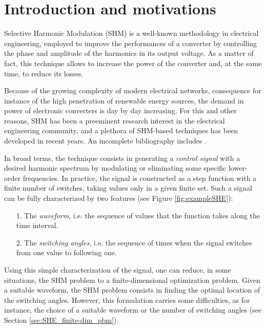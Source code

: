\documentclass[twocolumn]{autart}    %
\begin{document}
\begin{frontmatter}
\end{frontmatter}


\section{Introduction and motivations}\label{Section1}

Selective Harmonic Modulation (SHM) \cite{Rodriguez2002} is a well-known methodology in electrical engineering, employed to improve the performances of a converter by controlling the phase and amplitude of the harmonics in its output voltage. As a matter of fact, this technique allows to increase the power of the converter and, at the same time, to reduce its losses. 

Because of the growing complexity of modern electrical networks, consequence for instance of the high penetration of renewable energy sources, the demand in power of electronic converters is day by day increasing. For this and other reasons, SHM has been a preeminent research interest in the electrical engineering community, and a plethora of SHM-based techniques has been developed in recent years. An incomplete bibliography includes \cite{duranay2017selective,Janabi2020,Yang2017}.

In broad terms, the technique consists in generating a \textit{control signal} with a desired harmonic spectrum by modulating or eliminating some specific lower-order frequencies. In practice, the signal is constructed as a step function with a finite number of switches, taking values only in a given finite set. Such a signal can be fully characterized by two features (see Figure \ref{fig:exampleSHE}): 
\begin{itemize}
	\item[1.] The \textit{waveform}, i.e. the sequence of values that the function takes along the time interval.
	\item[2.] The \textit{switching angles}, i.e. the sequence of times when the signal switches from one value to following one. 
\end{itemize}
Using this simple characterization of the signal, one can reduce, in some situations, the SHM problem to a finite-dimensional optimization problem.
Given a suitable waveform, the SHM problem consists in finding the optimal location of the switching angles. However, this formulation carries some difficulties,  as for instance, the choice of a suitable waveform or the number of switching angles (see Section \ref{sec:SHE_finite-dim_pbm}).  
\end{document}
